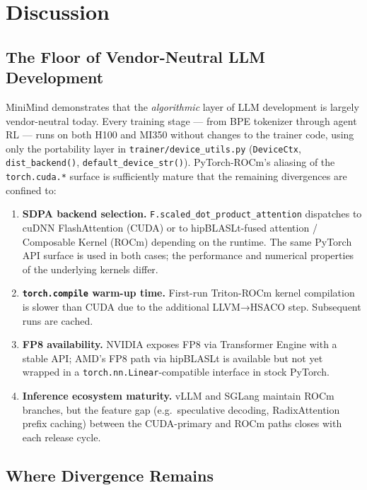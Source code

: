 \section{Discussion}
\label{sec:discussion}

\subsection{The Floor of Vendor-Neutral LLM Development}
\label{sec:discussion:floor}

MiniMind demonstrates that the \emph{algorithmic} layer of LLM development
is largely vendor-neutral today.  Every training stage — from BPE tokenizer
through agent RL — runs on both H100 and MI350 without changes to the
trainer code, using only the portability layer in \texttt{trainer/device\_utils.py}
(\texttt{DeviceCtx}, \texttt{dist\_backend()}, \texttt{default\_device\_str()}).
PyTorch-ROCm's aliasing of the \texttt{torch.cuda.*} surface is sufficiently
mature that the remaining divergences are confined to:

\begin{enumerate}
\item \textbf{SDPA backend selection.} \texttt{F.scaled\_dot\_product\_attention}
  dispatches to cuDNN FlashAttention (CUDA) or to hipBLASLt-fused attention /
  Composable Kernel (ROCm) depending on the runtime.  The same PyTorch API
  surface is used in both cases; the performance and numerical properties of
  the underlying kernels differ.
\item \textbf{\texttt{torch.compile} warm-up time.}  First-run Triton-ROCm
  kernel compilation is slower than CUDA due to the additional LLVM→HSACO
  step.  Subsequent runs are cached.
\item \textbf{FP8 availability.}  NVIDIA exposes FP8 via Transformer Engine
  with a stable API; AMD's FP8 path via hipBLASLt is available but not yet
  wrapped in a \texttt{torch.nn.Linear}-compatible interface in stock PyTorch.
\item \textbf{Inference ecosystem maturity.}  vLLM and SGLang maintain
  ROCm branches, but the feature gap (e.g.\ speculative decoding, RadixAttention
  prefix caching) between the CUDA-primary and ROCm paths closes with each
  release cycle.
\end{enumerate}

\subsection{Where Divergence Remains}
\label{sec:discussion:divergence}

